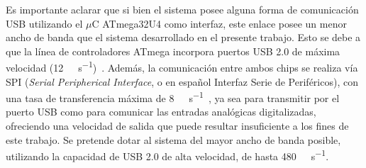 Es importante aclarar que si bien el sistema posee alguna forma de comunicación USB utilizando el $\mu$C ATmega32U4 como interfaz, este enlace posee un menor ancho de banda que el sistema desarrollado en el presente trabajo. Esto se debe a que la línea de controladores ATmega incorpora puertos USB 2.0 de máxima velocidad (\SI{12}{\mega\bit\per\second})~\cite{Atmel2016}. Además, la comunicación entre ambos chips se realiza vía SPI (\textit{Serial Peripherical Interface}, o en español Interfaz Serie de Periféricos), con una tasa de transferencia máxima de \SI{8}{\mega\bit\per\second}~\cite{Atmel2016}, ya sea para transmitir por el puerto USB como para comunicar las entradas analógicas digitalizadas, ofreciendo una velocidad de salida que puede resultar insuficiente a los fines de este trabajo. Se pretende dotar al sistema del mayor ancho de banda posible, utilizando la capacidad de USB 2.0 de alta velocidad, de hasta \SI{480}{\mega\bit\per\second}.